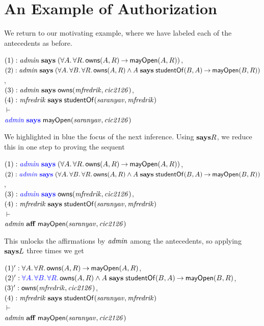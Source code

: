\documentclass[11pt]{article}
\begin{document}
\section{An Example of Authorization}

We return to our motivating example, where we have labeled each of the
antecedents as before.
\begin{tabbing}
  \quad $(1) : \mathit{admin} \mathrel{\mathbf{says}} (\forall A.\, \forall R.\, \mathsf{owns}(A, R) \mathbin{\rightarrow} \mathsf{mayOpen}(A, R))$, \\
  \quad $(2) : \mathit{admin} \mathrel{\mathbf{says}} (\forall A.\, \forall B.\, \forall R.\, \mathsf{owns}(A, R)
  \land A \mathrel{\mathbf{says}} \mathsf{studentOf}(B, A) \mathbin{\rightarrow} \mathsf{mayOpen}(B, R))$, \\[1ex]
  \quad $(3) : \mathit{admin} \mathrel{\mathbf{says}} \mathsf{owns}(\mathit{mfredrik}, \mathit{cic2126})$, \\
  \quad $(4) : \mathit{mfredrik} \mathrel{\mathbf{says}} \mathsf{studentOf}(\mathit{saranyav}, \mathit{mfredrik})$ \\[1ex]
  \quad $\vdash$ \\[1ex]
  \quad ${\color{blue}\mi{admin} \says\null} \ms{mayOpen}(\mi{saranyav}, \mi{cic2126})$
\end{tabbing}
We highlighted in blue the focus of the next inference.  Using $\mathbf{says}R$, we
reduce this in one step to proving the sequent
\begin{tabbing}
  \quad $(1) : {\color{blue}\mi{admin} \says\null} (\forall A.\, \forall R.\, \ms{owns}(A, R) \arrow \ms{mayOpen}(A, R))$, \\
  \quad $(2) : {\color{blue}\mi{admin} \says\null} (\forall A.\, \forall B.\, \forall R.\, \ms{owns}(A, R)
  \land A \says \ms{studentOf}(B, A) \arrow \ms{mayOpen}(B, R))$, \\[1ex]
  \quad $(3) : {\color{blue}\mi{admin} \says\null} \ms{owns}(\mi{mfredrik}, \mi{cic2126})$, \\
  \quad $(4) : \mathit{mfredrik} \mathrel{\mathbf{says}} \mathsf{studentOf}(\mathit{saranyav}, \mathit{mfredrik})$ \\[1ex]
  \quad $\vdash$ \\[1ex]
  \quad $\mathit{admin} \mathrel{\mathbf{aff}} \mathsf{mayOpen}(\mathit{saranyav}, \mathit{cic2126})$
\end{tabbing}
This unlocks the affirmations by $\mathit{admin}$ among the antecedents, so
applying $\mathbf{says}L$ three times we get
\begin{tabbing}
  \quad $(1)' : \forall A.\, \forall R.\, \mathsf{owns}(A, R) \mathbin{\rightarrow} \mathsf{mayOpen}(A, R)$, \\
  \quad $(2)' : {\color{blue}\forall A.\, \forall B.\, \forall R.}\, \mathsf{owns}(A, R)
  \land A \mathrel{\mathbf{says}} \mathsf{studentOf}(B, A) \mathbin{\rightarrow} \mathsf{mayOpen}(B, R)$, \\[1ex]
  \quad $(3)' : \mathsf{owns}(\mathit{mfredrik}, \mathit{cic2126})$, \\
  \quad $(4) : \mathit{mfredrik} \mathrel{\mathbf{says}} \mathsf{studentOf}(\mathit{saranyav}, \mathit{mfredrik})$ \\[1ex]
  \quad $\vdash$ \\[1ex]
  \quad $\mathit{admin} \mathrel{\mathbf{aff}} \mathsf{mayOpen}(\mathit{saranyav}, \mathit{cic2126})$
\end{tabbing}
\end{document}
